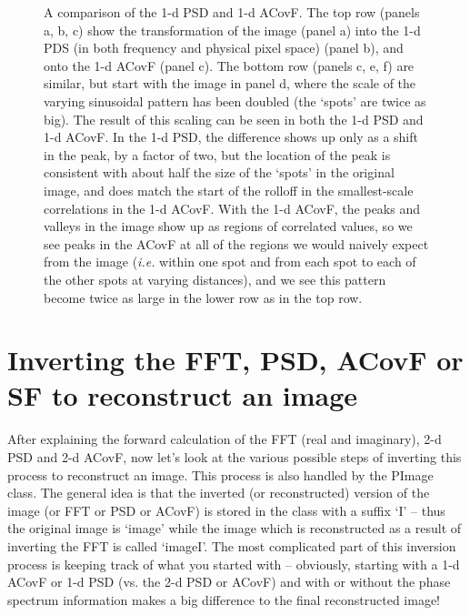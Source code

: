 \documentclass[11pt,preprint]{aastex}
\begin{document}
\begin{figure}[htpb]
\caption{{\small 
A comparison of the 1-d PSD and 1-d ACovF. The top row (panels a, b, c) show the transformation of the image (panel a) into the 1-d PDS (in both frequency and physical pixel space) (panel b), and onto the 1-d ACovF (panel c). The bottom row (panels c, e, f) are similar, but start with the image in panel d, where the scale of the varying sinusoidal pattern has been doubled (the `spots' are twice as big). The result of this scaling can be seen in both the 1-d PSD and 1-d ACovF. In the 1-d PSD, the difference shows up only as a shift in the peak, by a factor of two, but the location of the peak is consistent with about half the size of the `spots' in the original image, and does match the start of the rolloff in the smallest-scale correlations in the 1-d ACovF. With the 1-d ACovF, the peaks and valleys in the image show up as regions of correlated values, so we see peaks in the ACovF at all of the regions we would naively expect from the image ({\it i.e.} within one spot and from each spot to each of the other spots at varying distances), and we see this pattern become twice as large in the lower row as in the top row. }}
\label{fig:1d_psd_ACovF}
\end{figure}


\section{Inverting the FFT, PSD, ACovF or SF to reconstruct an image}

After explaining the forward calculation of the FFT (real and imaginary), 2-d PSD and 2-d ACovF, now let's look at the various possible steps of inverting this process to reconstruct an image. This process is also handled by the PImage class. The general idea is that the inverted (or reconstructed) version of the image (or FFT or PSD or ACovF) is stored in the class with a suffix `I' -- thus the original image is `image' while the image which is reconstructed as a result of inverting the FFT is called `imageI'.  The most complicated part of this inversion process is keeping track of what you started with -- obviously, starting with a 1-d ACovF or 1-d PSD (vs. the 2-d PSD or ACovF) and with or without the phase spectrum information makes a big difference to the final reconstructed image! 
\end{document}
